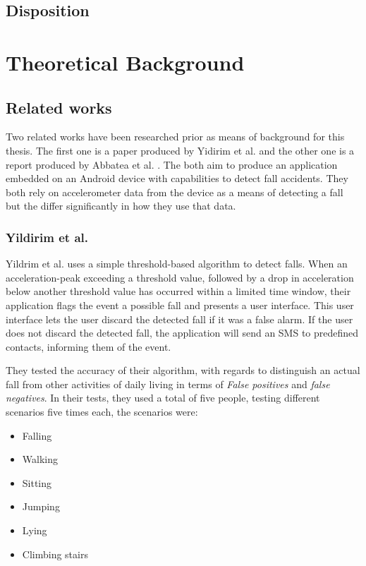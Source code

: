 \documentclass[12pt, a4paper, onecolumn]{article}
\begin{document}
		\subsection{Disposition}
		
	\newpage
	
	\section{Theoretical Background}
	
	\subsection{Related works} Two related works have been researched prior as means of background for this thesis. The first one is a paper produced by Yidirim et al. \cite{int_journ} and the other one is a report produced by Abbatea et al. \cite{piza_uni}. The both aim to produce an application embedded on an Android device with capabilities to detect fall accidents. They both rely on accelerometer data from the device as a means of detecting a fall but the differ significantly in how they use that data. 
	
	\subsubsection{Yildirim et al.}
	Yildrim et al. \cite{int_journ} uses a simple threshold-based algorithm to detect falls. When an acceleration-peak exceeding a threshold value, followed by a drop in acceleration below another threshold value has occurred within a limited time window, their application flags the event a possible fall and presents a user interface. This user interface lets the user discard the detected fall if it was a false alarm. If the user does not discard the detected fall, the application will send an SMS to predefined contacts, informing them of the event. 
	
	They tested the accuracy of their algorithm, with regards to distinguish an actual fall from other activities of daily living in terms of \textit{False positives} and \textit{false negatives}. In their tests, they used a total of five people, testing different scenarios five times each, the scenarios were:
	
	\begin{itemize}
		\item Falling
		\item Walking
		\item Sitting
		\item Jumping
		\item Lying
		\item Climbing stairs
	\end{itemize}
	
\end{document}
